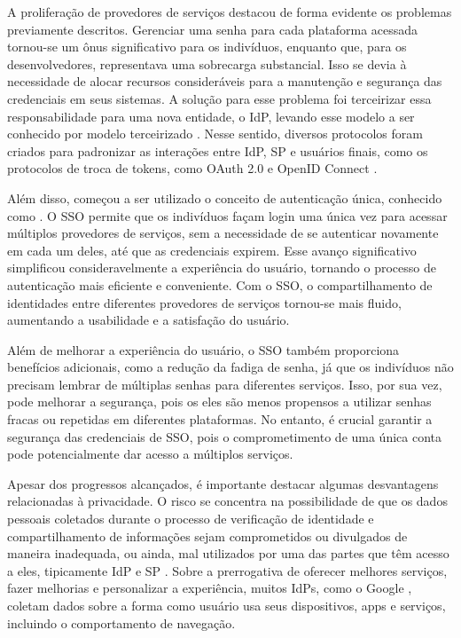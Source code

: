 A proliferação de provedores de serviços destacou de forma evidente os problemas previamente descritos. Gerenciar uma senha para cada plataforma acessada tornou-se um ônus significativo para os indivíduos, enquanto que, para os desenvolvedores, representava uma sobrecarga substancial. Isso se devia à necessidade de alocar recursos consideráveis para a manutenção e segurança das credenciais em seus sistemas. A solução para esse problema foi terceirizar essa responsabilidade para uma nova entidade, o \acs{IdP}, levando esse modelo a ser conhecido por modelo terceirizado \cite{revisao-ssi-frederico}. Nesse sentido, diversos protocolos foram criados para padronizar as interações entre \acs{IdP}, \acs{SP} e usuários finais, como os protocolos de troca de tokens, como OAuth 2.0 \cite{oauth} e OpenID Connect \cite{openid}.

Além disso, começou a ser utilizado o conceito de autenticação única, conhecido como . O \acs{SSO} permite que os indivíduos façam login uma única vez para acessar múltiplos provedores de serviços, sem a necessidade de se autenticar novamente em cada um deles, até que as credenciais expirem. Esse avanço significativo simplificou consideravelmente a experiência do usuário, tornando o processo de autenticação mais eficiente e conveniente. Com o \acs{SSO}, o compartilhamento de identidades entre diferentes provedores de serviços tornou-se mais fluido, aumentando a usabilidade e a satisfação do usuário.

Além de melhorar a experiência do usuário, o \acs{SSO} também proporciona benefícios adicionais, como a redução da fadiga de senha, já que os indivíduos não precisam lembrar de múltiplas senhas para diferentes serviços. Isso, por sua vez, pode melhorar a segurança, pois os eles são menos propensos a utilizar senhas fracas ou repetidas em diferentes plataformas. No entanto, é crucial garantir a segurança das credenciais de \acs{SSO}, pois o comprometimento de uma única conta pode potencialmente dar acesso a múltiplos serviços.

Apesar dos progressos alcançados, é importante destacar algumas desvantagens relacionadas à privacidade. O risco se concentra na possibilidade de que os dados pessoais coletados durante o processo de verificação de identidade e compartilhamento de informações sejam comprometidos ou divulgados de maneira inadequada, ou ainda, mal utilizados por uma das partes que têm acesso a eles, tipicamente \acs{IdP} e \acs{SP} \cite{pandey2012investigation}. Sobre a prerrogativa de oferecer melhores serviços, fazer melhorias e personalizar a experiência, muitos \acs{IdP}s, como o Google \cite{sidell2020google}, coletam dados sobre a forma como usuário usa seus dispositivos, apps e serviços, incluindo o comportamento de navegação.


